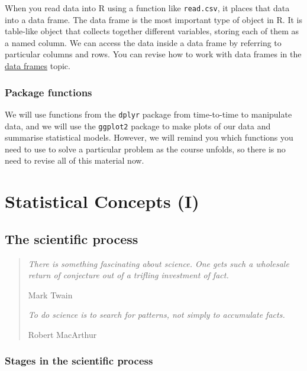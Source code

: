 \documentclass[]{book}
\begin{document}
When you read data into R using a function like \texttt{read.csv}, it
places that data into a data frame. The data frame is the most important
type of object in R. It is table-like object that collects together
different variables, storing each of them as a named column. We can
access the data inside a data frame by referring to particular columns
and rows. You can revise how to work with data frames in the
\href{\%7B\%7Bsite.baseurl-L1\%7D\%7D/data-frames.html\#access-data}{data
frames} topic.

\section{Package functions}\label{package-functions}

We will use functions from the \texttt{dplyr} package from time-to-time
to manipulate data, and we will use the \texttt{ggplot2} package to make
plots of our data and summarise statistical models. However, we will
remind you which functions you need to use to solve a particular problem
as the course unfolds, so there is no need to revise all of this
material now.

\part{Statistical Concepts
(I)}\label{part-statistical-concepts-i}

\hypertarget{the-scientific-process}{\chapter{The scientific
process}\label{the-scientific-process}}

\begin{quote}
\emph{There is something fascinating about science. One gets such a
wholesale return of conjecture out of a trifling investment of fact.}

Mark Twain

\emph{To do science is to search for patterns, not simply to accumulate
facts.}

Robert MacArthur
\end{quote}

\section{Stages in the scientific
process}\label{stages-scientific-process}
\end{document}

